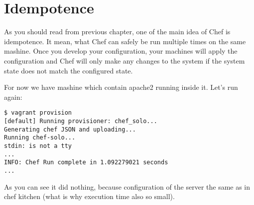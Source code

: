 \section{Idempotence}
\label{sec:solo-idempotence}

As you should read from previous chapter, one of the main idea of Chef is idempotence. It mean, what Chef can safely be run multiple times on the same mashine. Once you develop your configuration, your machines will apply the configuration and Chef will only make any changes to the system if the system state does not match the configured state.

For now we have mashine which contain apache2 running inside it. Let's run  again:

\begin{lstlisting}[label=lst:my-cloud-idempotence1]
$ vagrant provision
[default] Running provisioner: chef_solo...
Generating chef JSON and uploading...
Running chef-solo...
stdin: is not a tty
...
INFO: Chef Run complete in 1.092279021 seconds
...
\end{lstlisting}

As you can see it did nothing, because configuration of the server the same as in chef kitchen (what is why execution time also so small).
